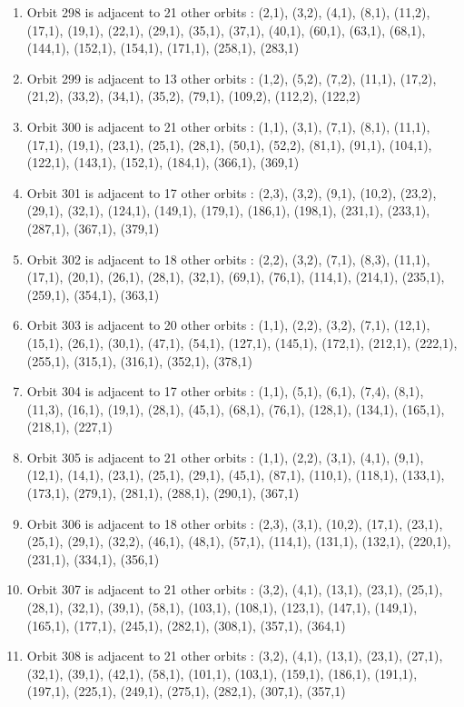\documentclass[12pt]{article}
\begin{document}
\begin{enumerate}
\item Orbit 298 is adjacent to 21 other orbits : (2,1), (3,2), (4,1), (8,1), (11,2), (17,1), (19,1), (22,1), (29,1), (35,1), (37,1), (40,1), (60,1), (63,1), (68,1), (144,1), (152,1), (154,1), (171,1), (258,1), (283,1)
\item Orbit 299 is adjacent to 13 other orbits : (1,2), (5,2), (7,2), (11,1), (17,2), (21,2), (33,2), (34,1), (35,2), (79,1), (109,2), (112,2), (122,2)
\item Orbit 300 is adjacent to 21 other orbits : (1,1), (3,1), (7,1), (8,1), (11,1), (17,1), (19,1), (23,1), (25,1), (28,1), (50,1), (52,2), (81,1), (91,1), (104,1), (122,1), (143,1), (152,1), (184,1), (366,1), (369,1)
\item Orbit 301 is adjacent to 17 other orbits : (2,3), (3,2), (9,1), (10,2), (23,2), (29,1), (32,1), (124,1), (149,1), (179,1), (186,1), (198,1), (231,1), (233,1), (287,1), (367,1), (379,1)
\item Orbit 302 is adjacent to 18 other orbits : (2,2), (3,2), (7,1), (8,3), (11,1), (17,1), (20,1), (26,1), (28,1), (32,1), (69,1), (76,1), (114,1), (214,1), (235,1), (259,1), (354,1), (363,1)
\item Orbit 303 is adjacent to 20 other orbits : (1,1), (2,2), (3,2), (7,1), (12,1), (15,1), (26,1), (30,1), (47,1), (54,1), (127,1), (145,1), (172,1), (212,1), (222,1), (255,1), (315,1), (316,1), (352,1), (378,1)
\item Orbit 304 is adjacent to 17 other orbits : (1,1), (5,1), (6,1), (7,4), (8,1), (11,3), (16,1), (19,1), (28,1), (45,1), (68,1), (76,1), (128,1), (134,1), (165,1), (218,1), (227,1)
\item Orbit 305 is adjacent to 21 other orbits : (1,1), (2,2), (3,1), (4,1), (9,1), (12,1), (14,1), (23,1), (25,1), (29,1), (45,1), (87,1), (110,1), (118,1), (133,1), (173,1), (279,1), (281,1), (288,1), (290,1), (367,1)
\item Orbit 306 is adjacent to 18 other orbits : (2,3), (3,1), (10,2), (17,1), (23,1), (25,1), (29,1), (32,2), (46,1), (48,1), (57,1), (114,1), (131,1), (132,1), (220,1), (231,1), (334,1), (356,1)
\item Orbit 307 is adjacent to 21 other orbits : (3,2), (4,1), (13,1), (23,1), (25,1), (28,1), (32,1), (39,1), (58,1), (103,1), (108,1), (123,1), (147,1), (149,1), (165,1), (177,1), (245,1), (282,1), (308,1), (357,1), (364,1)
\item Orbit 308 is adjacent to 21 other orbits : (3,2), (4,1), (13,1), (23,1), (27,1), (32,1), (39,1), (42,1), (58,1), (101,1), (103,1), (159,1), (186,1), (191,1), (197,1), (225,1), (249,1), (275,1), (282,1), (307,1), (357,1)

\end{enumerate}
\end{document}
